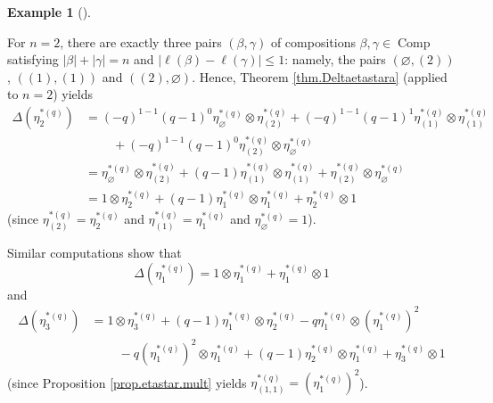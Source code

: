 \documentclass[numbers=enddot,12pt,final,onecolumn,notitlepage]{scrartcl}%
\theoremstyle{definition}
\newtheorem{exam}[theo]{Example}
\newenvironment{example}[1][]
{\begin{exam}[#1]\begin{leftbar}}
{\end{leftbar}\end{exam}}
\begin{document}
\begin{example}
For $n=2$, there are exactly three pairs $\left(  \beta,\gamma\right)  $ of
compositions $\beta,\gamma\in\operatorname*{Comp}$ satisfying $\left\vert
\beta\right\vert +\left\vert \gamma\right\vert =n$ and $\left\vert \ell\left(
\beta\right)  -\ell\left(  \gamma\right)  \right\vert \leq1$: namely, the
pairs $\left(  \varnothing,\left(  2\right)  \right)  $, $\left(  \left(
1\right)  ,\left(  1\right)  \right)  $ and $\left(  \left(  2\right)
,\varnothing\right)  $. Hence, Theorem \ref{thm.Deltaetastara} (applied to
$n=2$) yields%
\begin{align*}
\Delta\left(  \eta_{2}^{\ast\left(  q\right)  }\right)   &  =\left(
-q\right)  ^{1-1}\left(  q-1\right)  ^{0}\eta_{\varnothing}^{\ast\left(
q\right)  }\otimes\eta_{\left(  2\right)  }^{\ast\left(  q\right)  }+\left(
-q\right)  ^{1-1}\left(  q-1\right)  ^{1}\eta_{\left(  1\right)  }%
^{\ast\left(  q\right)  }\otimes\eta_{\left(  1\right)  }^{\ast\left(
q\right)  }\\
&  \ \ \ \ \ \ \ \ \ \ +\left(  -q\right)  ^{1-1}\left(  q-1\right)  ^{0}%
\eta_{\left(  2\right)  }^{\ast\left(  q\right)  }\otimes\eta_{\varnothing
}^{\ast\left(  q\right)  }\\
&  =\eta_{\varnothing}^{\ast\left(  q\right)  }\otimes\eta_{\left(  2\right)
}^{\ast\left(  q\right)  }+\left(  q-1\right)  \eta_{\left(  1\right)  }%
^{\ast\left(  q\right)  }\otimes\eta_{\left(  1\right)  }^{\ast\left(
q\right)  }+\eta_{\left(  2\right)  }^{\ast\left(  q\right)  }\otimes
\eta_{\varnothing}^{\ast\left(  q\right)  }\\
&  =1\otimes\eta_{2}^{\ast\left(  q\right)  }+\left(  q-1\right)  \eta
_{1}^{\ast\left(  q\right)  }\otimes\eta_{1}^{\ast\left(  q\right)  }+\eta
_{2}^{\ast\left(  q\right)  }\otimes1
\end{align*}
(since $\eta_{\left(  2\right)  }^{\ast\left(  q\right)  } =\eta_{2}%
^{\ast\left(  q\right)  }$ and $\eta_{\left(  1\right)  }^{\ast\left(
q\right)  } =\eta_{1}^{\ast\left(  q\right)  }$ and $\eta_{\varnothing}%
^{\ast\left(  q\right)  }=1$).

Similar computations show that%
\[
\Delta\left(  \eta_{1}^{\ast\left(  q\right)  }\right)  =1\otimes\eta
_{1}^{\ast\left(  q\right)  }+\eta_{1}^{\ast\left(  q\right)  }\otimes1
\]
and%
\begin{align*}
\Delta\left(  \eta_{3}^{\ast\left(  q\right)  }\right)   &  =1\otimes\eta
_{3}^{\ast\left(  q\right)  }+\left(  q-1\right)  \eta_{1}^{\ast\left(
q\right)  }\otimes\eta_{2}^{\ast\left(  q\right)  }-q\eta_{1}^{\ast\left(
q\right)  }\otimes\left(  \eta_{1}^{\ast\left(  q\right)  }\right)  ^{2}\\
&  \ \ \ \ \ \ \ \ \ \ -q\left(  \eta_{1}^{\ast\left(  q\right)  }\right)
^{2}\otimes\eta_{1}^{\ast\left(  q\right)  }+\left(  q-1\right)  \eta
_{2}^{\ast\left(  q\right)  }\otimes\eta_{1}^{\ast\left(  q\right)  }+\eta
_{3}^{\ast\left(  q\right)  }\otimes1
\end{align*}
(since Proposition \ref{prop.etastar.mult} yields $\eta_{\left(  1,1\right)
}^{\ast\left(  q\right)  }=\left(  \eta_{1}^{\ast\left(  q\right)  }\right)
^{2}$).
\end{example}
\end{document}
